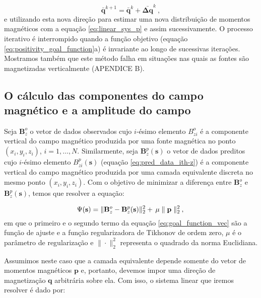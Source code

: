 \begin{equation}
\bar{\mathbf{q}}^{k+1} = \bar{\mathbf{q}}^{k} + \bar{\mathbf{\Delta q}}^{k} \: ,
\label{eq:q_next}
\end{equation}
e utilizando esta nova direção para estimar uma nova distribuição de momentos magnéticos com a equação \ref{eq:linear_sys_p} e assim sucessivamente. O processo iterativo é interrompido quando a função objetivo (equação \ref{eq:positivity_goal_function}a) é invariante ao longo de sucessivas iterações. Mostramos também que este método falha em situações nas quais as fontes são magnetizadas verticalmente (APENDICE B).

\subsection{O cálculo das componentes do campo magnético e a amplitude do campo}
\label{subsec:componentes_vec}

Seja $\mathbf{B}_{z}^{o}$ o vetor de dados observados cujo $i$-ésimo elemento $B_{zi}^{o}$ é a componente vertical do campo magnético produzida por uma fonte magnética no ponto $(x_{i},y_{i},z_{i})$, $i = 1, \dots, N$. Similarmente, seja $\mathbf{B}_{z}^{p} (\mathbf{s})$ o vetor de dados preditos cujo $i$-ésimo elemento $B_{zi}^{p}(\mathbf{s})$ (equação \ref{eq:pred_data_ith-z}) é a componente vertical do campo magnético produzida por uma camada equivalente discreta no mesmo ponto $(x_{i},y_{i},z_{i})$. Com o objetivo de minimizar a diferença entre $\mathbf{B}_{z}^{o}$ e $\mathbf{B}_{z}^{p} (\mathbf{s})$, temos que resolver a equação:

\begin{equation}
\Psi(\mathbf{s}) =\lVert \mathbf{B}_{z}^{o} - \mathbf{B}_{z}^{p} (\mathbf{s}) 
	\rVert_{2}^{2} + \, \mu  \parallel \mathbf{p} \parallel_{2}^{2} \: , \\
\label{eq:goal_function_vec}
\end{equation}
em que o primeiro e o segundo termo da equação \ref{eq:goal_function_vec} são a função de ajuste e a função regularizadora de Tikhonov de ordem zero, $\mu$ é o parâmetro de regularização e $\| \cdot \|_{2}^{2}$ representa o quadrado da norma Euclidiana. 

Assumimos neste caso que a camada equivalente depende somente do vetor de momentos magnéticos $\mathbf{p}$ e, portanto, devemos impor uma direção de magnetização $\mathbf{q}$ arbitrária sobre ela. Com isso, o sistema linear que iremos resolver é dado por:

